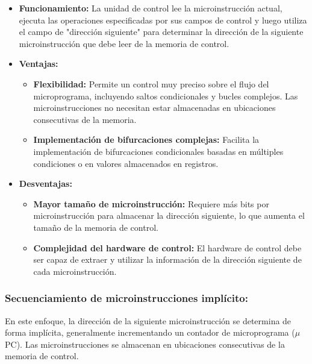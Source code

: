 \begin{itemize}
    \item \textbf{Funcionamiento:} La unidad de control lee la microinstrucción actual, ejecuta las operaciones especificadas por sus campos de control y luego utiliza el campo de "dirección siguiente" para determinar la dirección de la siguiente microinstrucción que debe leer de la memoria de control.
    \item \textbf{Ventajas:}
        \begin{itemize}
            \item \textbf{Flexibilidad:} Permite un control muy preciso sobre el flujo del microprograma, incluyendo saltos condicionales y bucles complejos. Las microinstrucciones no necesitan estar almacenadas en ubicaciones consecutivas de la memoria.
            \item \textbf{Implementación de bifurcaciones complejas:} Facilita la implementación de bifurcaciones condicionales basadas en múltiples condiciones o en valores almacenados en registros.
        \end{itemize}
    \item \textbf{Desventajas:}
        \begin{itemize}
            \item \textbf{Mayor tamaño de microinstrucción:} Requiere más bits por microinstrucción para almacenar la dirección siguiente, lo que aumenta el tamaño de la memoria de control.
            \item \textbf{Complejidad del hardware de control:} El hardware de control debe ser capaz de extraer y utilizar la información de la dirección siguiente de cada microinstrucción.
        \end{itemize}
\end{itemize}
\begin{center}
    
\end{center}

\subsubsection*{Secuenciamiento de microinstrucciones implícito:}

En este enfoque, la dirección de la siguiente microinstrucción se determina de forma implícita, generalmente incrementando un contador de microprograma ($\mu$PC). Las microinstrucciones se almacenan en ubicaciones consecutivas de la memoria de control.

